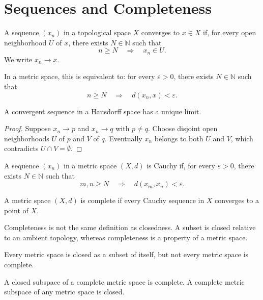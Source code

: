 \documentclass[answers,12pt,addpoints]{exam}
\begin{document}
\section{Sequences and Completeness}

\begin{definition}
A sequence $(x_n)$ in a topological space $X$ converges to
$x\in X$ if, for every open neighborhood $U$ of $x$,
there exists $N\in\mathbb{N}$ such that
\[
n\geq N\quad\Longrightarrow\quad x_n\in U.
\]
We write $x_n\to x$.

In a metric space, this is equivalent to:
for every $\varepsilon>0$, there exists $N\in\mathbb{N}$
such that
\[
n\geq N\quad\Longrightarrow\quad d(x_n,x)<\varepsilon.
\]
\end{definition}

\begin{theorem}
A convergent sequence in a Hausdorff space has a unique
limit.
\end{theorem}

\begin{proof}
Suppose $x_n\to p$ and $x_n\to q$ with $p\neq q$.
Choose disjoint open neighborhoods $U$ of $p$ and $V$ of
$q$. Eventually $x_n$ belongs to both $U$ and $V$, which
contradicts $U\cap V=\emptyset$.
\end{proof}

\begin{definition}
A sequence $(x_n)$ in a metric space $(X,d)$ is Cauchy if,
for every $\varepsilon>0$, there exists $N\in\mathbb{N}$
such that
\[
m,n\geq N
\quad\Longrightarrow\quad
d(x_m,x_n)<\varepsilon.
\]
\end{definition}

\begin{definition}
A metric space $(X,d)$ is complete if every Cauchy sequence
in $X$ converges to a point of $X$.
\end{definition}

\begin{remark}
Completeness is not the same definition as closedness.
A subset is closed relative to an ambient topology,
whereas completeness is a property of a metric space.

Every metric space is closed as a subset of itself,
but not every metric space is complete.

A closed subspace of a complete metric space is complete.
A complete metric subspace of any metric space is closed.
\end{remark}
\end{document}
